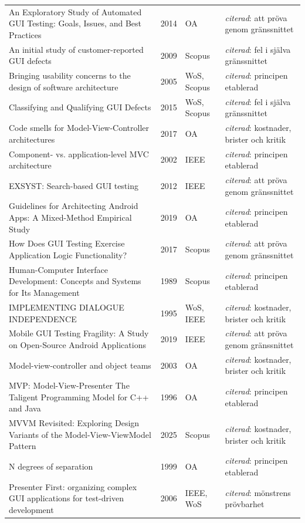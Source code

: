 \begin{longtable}{@{}%
  >{\raggedright\arraybackslash}p{}c%
  >{\raggedright\arraybackslash}p{}%
  >{\raggedright\arraybackslash}p{}@{}}
An Exploratory Study of Automated GUI Testing: Goals, Issues, and Best Practices & 2014 & OA & \emph{citerad}: att pröva genom gränssnittet \\
An initial study of customer-reported GUI defects & 2009 & Scopus & \emph{citerad}: fel i själva gränssnittet \\
Bringing usability concerns to the design of software architecture & 2005 & WoS, Scopus & \emph{citerad}: principen etablerad \\
Classifying and Qualifying GUI Defects & 2015 & WoS, Scopus & \emph{citerad}: fel i själva gränssnittet \\
Code smells for Model-View-Controller architectures & 2017 & OA & \emph{citerad}: kostnader, brister och kritik \\
Component- vs. application-level MVC architecture & 2002 & IEEE & \emph{citerad}: principen etablerad \\
EXSYST: Search-based GUI testing & 2012 & IEEE & \emph{citerad}: att pröva genom gränssnittet \\
Guidelines for Architecting Android Apps: A Mixed-Method Empirical Study & 2019 & OA & \emph{citerad}: principen etablerad \\
How Does GUI Testing Exercise Application Logic Functionality? & 2017 & Scopus & \emph{citerad}: att pröva genom gränssnittet \\
Human-Computer Interface Development: Concepts and Systems for Its Management & 1989 & Scopus & \emph{citerad}: principen etablerad \\
IMPLEMENTING DIALOGUE INDEPENDENCE & 1995 & WoS, IEEE & \emph{citerad}: kostnader, brister och kritik \\
Mobile GUI Testing Fragility: A Study on Open-Source Android Applications & 2019 & IEEE & \emph{citerad}: att pröva genom gränssnittet \\
Model-view-controller and object teams & 2003 & OA & \emph{citerad}: kostnader, brister och kritik \\
MVP: Model-View-Presenter The Taligent Programming Model for C++ and Java & 1996 & OA & \emph{citerad}: principen etablerad \\
MVVM Revisited: Exploring Design Variants of the Model-View-ViewModel Pattern & 2025 & Scopus & \emph{citerad}: kostnader, brister och kritik \\
N degrees of separation & 1999 & OA & \emph{citerad}: principen etablerad \\
Presenter First: organizing complex GUI applications for test-driven development & 2006 & IEEE, WoS & \emph{citerad}: mönstrens prövbarhet \\

\end{longtable}
